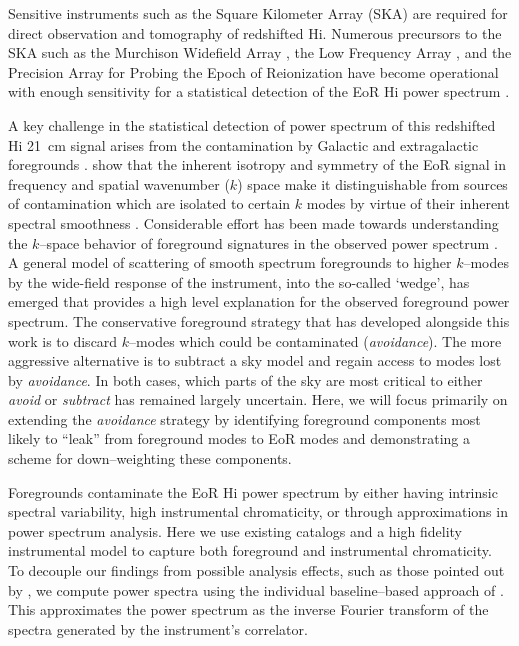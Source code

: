 \documentclass[preprint2,iop,numberedappendix]{emulateapj}
\begin{document}
Sensitive instruments such as the Square Kilometer Array (SKA) are required for direct observation and tomography of redshifted H{\sc i}. Numerous precursors to the SKA such as the Murchison Widefield Array \citep[MWA;][]{tin13,bow13,lon09}, the Low Frequency Array \citep[LOFAR;][]{van13}, and the Precision Array for Probing the Epoch of Reionization \citep[PAPER;][]{par10} have become operational with enough sensitivity for a statistical detection of the EoR H{\sc i} power spectrum \citep{thy13,bea13,bow06,pob14}. 

A key challenge in the statistical detection of power spectrum of this redshifted H{\sc i} 21~cm signal arises from the contamination by Galactic and extragalactic foregrounds \citep[see, e.g.,][]{dim02,zal04,fur06}. \citet{mor04} show that the inherent isotropy and symmetry of the EoR signal in frequency and spatial wavenumber ($k$) space make it distinguishable from sources of contamination which are isolated to certain $k$ modes by virtue of their inherent spectral smoothness \citep{mor06,bow09,liu11,par12,dil13}. Considerable effort has been made towards understanding the $k$--space behavior of foreground signatures in the observed power spectrum \citep{thy13,pob13,mor12,tro12,liu11,dat10,bow09,liu09}. A general model of scattering of smooth spectrum foregrounds to higher $k$--modes by the wide-field response of the instrument, into the so-called `wedge', has emerged that provides a high level explanation for the observed foreground power spectrum. The conservative foreground strategy that has developed alongside this work is to discard $k$--modes which could be contaminated ({\it avoidance}). The more aggressive alternative is to subtract a sky model and regain access to modes lost by {\it avoidance}. In both cases, which parts of the sky are most critical to either {\it avoid} or {\it subtract} has remained largely uncertain. Here, we will focus primarily on extending the {\it avoidance} strategy by identifying foreground components most likely to ``leak'' from foreground modes to EoR modes and demonstrating a scheme for down--weighting these components.

Foregrounds contaminate the EoR H{\sc i} power spectrum by either having intrinsic spectral variability, high instrumental chromaticity, or through approximations in power spectrum analysis. Here we use existing catalogs and a high fidelity instrumental model to capture both foreground and instrumental chromaticity. To decouple our findings from possible analysis effects, such as those pointed out by \citet{haz13}, we compute power spectra using the individual baseline--based approach of \citet{pob13,par14}. This approximates the power spectrum as the inverse Fourier transform of the spectra generated by the instrument's correlator. 
\end{document}
